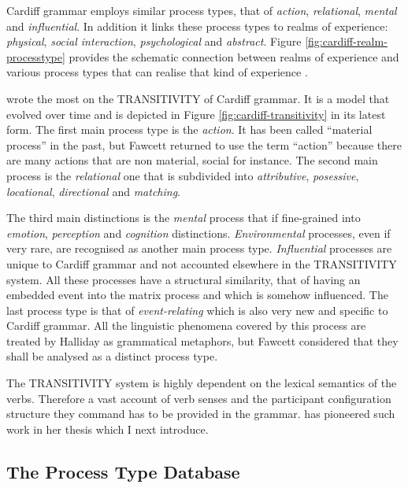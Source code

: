 Cardiff grammar employs similar process types, that of \textit{action}, \textit{relational}, \textit{mental} and \textit{influential}. In addition it links these process types to realms of experience: \textit{physical}, \textit{social interaction}, \textit{psychological} and \textit{abstract}.
Figure \ref{fig:cardiff-realm-processtype} provides the schematic connection between realms of experience and various process types that can realise that kind of experience \citep[37]{Fawcett2009}. 

\citet{Fawcett1973,Fawcett87-relational,Fawcett96} wrote the most on the TRANSITIVITY of Cardiff grammar. It is a model that evolved over time and is depicted in Figure \ref{fig:cardiff-transitivity} in its latest form. The first main process type is the \textit{action}. It has been called ``material process'' in the past, but Fawcett returned to use the term ``action'' because there are many actions that are non material, social for instance. The second main process is the \textit{relational} one that is subdivided into \textit{attributive}, \textit{posessive}, \textit{locational}, \textit{directional} and \textit{matching}.

The third main distinctions is the \textit{mental} process that if fine-grained into \textit{emotion}, \textit{perception} and \textit{cognition} distinctions. \textit{Environmental} processes, even if very rare, are recognised as another main process type. \textit{Influential} processes are unique to Cardiff grammar and not accounted elsewhere in the TRANSITIVITY system. All these processes have a structural similarity, that of having an embedded event into the matrix process and which is somehow influenced. The last process type is that of \textit{event-relating} which is also very new and specific to Cardiff grammar. All the linguistic phenomena covered by this process are treated by Halliday as grammatical metaphors, but Fawcett considered that they shall be analysed as a distinct process type.

The TRANSITIVITY system is highly dependent on the lexical semantics of the verbs. Therefore a vast account of verb senses and the participant configuration structure they command has to be provided in the grammar. \citet{Neale2002} has pioneered such work in her thesis which I next introduce. 

\subsection{The Process Type Database}
\label{sec:ptdb-description-technical}

